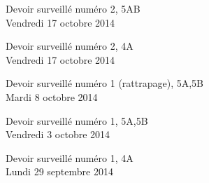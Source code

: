 \documentclass[a4paper,10pt]{article}
\begin{document}
\begin{feuilleDS}{Devoir surveillé numéro 2, 5AB\\ \small Vendredi 17 octobre 2014}  %
\end{feuilleDS}

\begin{feuilleDS}{Devoir surveillé numéro 2, 4A\\ \small Vendredi 17 octobre 2014}
\end{feuilleDS}


\begin{feuilleDS}{Devoir surveillé numéro 1 (rattrapage), 5A,5B\\ \small Mardi 8 octobre 2014}
\end{feuilleDS}


\begin{feuilleDS}{Devoir surveillé numéro 1, 5A,5B\\ \small Vendredi 3 octobre 2014}
\end{feuilleDS}



\begin{feuilleDS}{Devoir surveillé numéro 1, 4A\\ \small Lundi 29 septembre 2014}

\end{feuilleDS}
\end{document}
